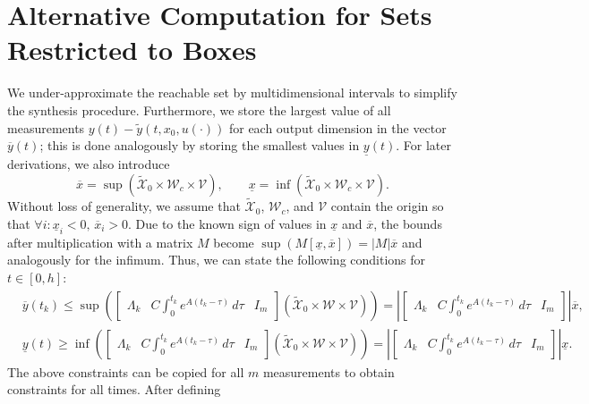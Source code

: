 \documentclass[EPiC]{easychair}
\renewcommand{\^}[1]{^{(#1)}}
\begin{document}
\section{Alternative Computation for Sets Restricted to Boxes}


We under-approximate the reachable set by multidimensional intervals to simplify the synthesis procedure. Furthermore, we store the largest value of all measurements $y(t) - \tilde{y}(t,x_0,u(\cdot))$ for each output dimension in the vector $\overline{y}(t)$; this is done analogously by storing the smallest values in $\underline{y}(t)$. For later derivations, we also introduce
\begin{equation*}
 \overline{x} = \sup\left(\tilde{\mathcal{X}}_0 \times \mathcal{W}_c \times \mathcal{V} \right), \qquad \underline{x} = \inf \left(\tilde{\mathcal{X}}_0 \times \mathcal{W}_c \times \mathcal{V} \right).
\end{equation*}
Without loss of generality, we assume that $\tilde{\mathcal{X}}_0$, $\mathcal{W}_c$, and $\mathcal{V}$ contain the origin so that $\forall i: \underline{x}_i <0, \, \overline{x}_i >0$. Due to the known sign of values in $\underline{x}$ and $\overline{x}$, the bounds after multiplication with a matrix $M$ become $\sup(M [\underline{x},\overline{x}]) = |M| \overline{x}$ and analogously for the infimum. Thus, we can state the following conditions for $t \in [0,h]$:
\begin{align*}
	& \overline{y}(t_k)  \leq \sup\left(  \begin{bmatrix} \Lambda_k & C \int_{0}^{t_k}e^{A(t_k-\tau)} \, d\tau & I_m \end{bmatrix} \left(\tilde{\mathcal{X}}_0 \times \mathcal{W} \times \mathcal{V} \right) \right) = \left|  \begin{bmatrix}\Lambda_k & C \int_{0}^{t_k}e^{A(t_k-\tau)} \, d\tau & I_m \end{bmatrix} \right| \overline{x}, \\
	& \underline{y}(t) \geq \inf\left(  \begin{bmatrix}\Lambda_k & C \int_{0}^{t_k}e^{A(t_k-\tau)} \, d\tau & I_m \end{bmatrix} \left( \tilde{\mathcal{X}}_0 \times \mathcal{W} \times \mathcal{V} \right) \right) = \left|  \begin{bmatrix}\Lambda_k & C \int_{0}^{t_k}e^{A(t_k-\tau)} \, d\tau & I_m \end{bmatrix} \right| \underline{x}.
\end{align*}
The above constraints can be copied for all $m$ measurements to obtain constraints for all times. After defining 
\end{document}
